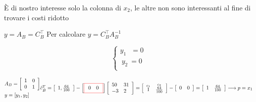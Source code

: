 {È di nostro interesse solo la colonna di $x_2$, le altre non sono interessanti al fine di trovare i costi ridotto

$y=A_B=C^{\top}_B$ Per calcolare $y=C^{\top}_BA_B^{-1}$
}

\[
\begin{cases*}
    y_1 \ \ \ =0\\ 
    \ y_2\ =0 \\
\end{cases*}
\]

\(
\begin{aligned}
    & A_B=\left[
    \begin{array}{ll}
        1 & 0 \\
        0 & 1
    \end{array}\right] \\
    & y=\left[y_1, y_2\right]
    \end{aligned}\\
     \tilde{c}_{\bar{B}}^T=\left[
        \begin{array}{ll}
1, \frac{64}{100}
\end{array}\right]-\left[\fcolorbox{red}{white}{$
\begin{array}{cc}
0 & 0
\end{array}$}\right]\left[
    \begin{array}{ll}
50 & 31 \\
-3 & 2
\end{array}\right]=\left[\begin{array}{ll}
\overset{c_1}{1} & \overset{c_2}{\frac{64}{100}} 
\end{array}\right ]-\left[\begin{array}{ll}
0 & 0
\end{array}\right]=\left[\begin{array}{ll}
1 & \frac{64}{100}
\end{array}\right] \longrightarrow p=x_1
\)


